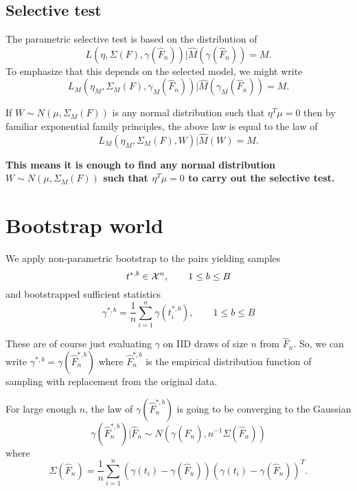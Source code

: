 \documentclass{article}
\begin{document}
\subsection{Selective test}
\label{sec:selective}

The parametric selective test is based on the distribution of 
$$
L(\eta, \Sigma(F), \gamma(\hat{F}_n)) \big \vert \hat{M}(\gamma(\hat{F}_n)) = M.
$$
To emphasize that this depends on the selected model, we might write
$$
L_M(\eta_M, \Sigma_M(F), \gamma_M(\hat{F}_n)) \big \vert \hat{M}(\gamma_M(\hat{F}_n)) = M.
$$

If $W \sim N(\mu, \Sigma_M(F))$ is any normal distribution
such that $\eta^T\mu=0$ then by familiar exponential family principles, the above law
is equal to the law of
$$
L_M(\eta_M, \Sigma_M(F), W) \big \vert \hat{M}(W) = M.
$$

{\bf This means it is enough to find any normal distribution
$W \sim N(\mu, \Sigma_M(F))$ such that $\eta^T\mu=0$ to carry out the
selective test.
}

\section{Bootstrap world}

We apply non-parametric bootstrap to the pairs 
yielding samples
$$
t^{*,b} \in {\cal X}^n, \qquad 1 \leq  b \leq B
$$
and  bootstrapped sufficient statistics
$$
\gamma^{*,b} = \frac{1}{n} \sum_{i=1}^n \gamma(t_i^{*,b}),  \qquad 1 \leq  b \leq B
$$

These are of course just evaluating $\gamma$ on 
IID draws of size $n$ from $\hat{F}_n$. So,
we can write
$\gamma^{*,b} = \gamma(\hat{F}_n^{*,b})$
where $\hat{F}_n^{*,b}$ is the empirical
distribution function of sampling with replacement from the original data.

For large enough $n$, the law of $\gamma(\hat{F}_n^{*,b})$ is going to be converging
to the Gaussian 
$$
\gamma(\hat{F}_n^{*,b}) | \hat{F}_n \sim N(\gamma(\hat{F}_n), n^{-1} \Sigma(\hat{F}_n))
$$
where
$$
\Sigma(\hat{F}_n) = \frac{1}{n} \sum_{i=1}^n \left(\gamma(t_i) - \gamma(\hat{F}_n) \right)\left(\gamma(t_i) - \gamma(\hat{F}_n) \right)^T.
$$
\end{document}
